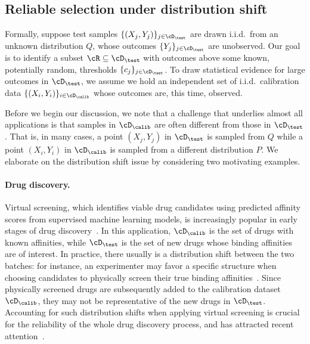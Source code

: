 \subsection{Reliable selection under distribution shift}


Formally, suppose test samples $\{(X_{j},Y_{j})\}_{j\in\cD_\test}$
are drawn i.i.d.~from an unknown distribution $Q$, whose outcomes $\{Y_j\}_{j\in\cD_\test}$
are unobserved. Our goal is to identify a subset $\cR\subseteq \cD_\test$
with outcomes above some known, potentially random,
thresholds $\{c_{ j}\}_{j\in \cD_\test}$. To draw statistical evidence for large outcomes in $\cD_\test$,
we assume we hold an independent set of
i.i.d.~calibration data $\{(X_i,Y_i)\}_{i\in \cD_\calib}$ whose outcomes
are, this time, observed.

Before we begin our discussion, we note that
a challenge that underlies almost all applications is that samples in $\cD_\calib$
are often different from those in $\cD_\test$.
That is, in many cases, a point $(X_{j},Y_{j})$ in $\cD_\test$ is sampled from $Q$ while a point $(X_{i},Y_{i})$ in $\cD_\calib$ is sampled from a different distribution $P$.
We elaborate on the distribution shift issue by considering two motivating examples.

\vspace{-0.3em}


\paragraph{Drug discovery.} %
{Virtual screening, which identifies viable drug candidates
using predicted affinity scores from supervised machine learning models,
is increasingly popular in early stages of drug discovery~\cite{huang2007drug,koutsoukas2017deep,vamathevan2019applications,dara2021machine}.
In this application, $\cD_\calib$ is the set of drugs with known affinities, while $\cD_\test$
is the set of new drugs whose binding affinities are of interest.}
In practice, there usually is a distribution shift between the two batches: for instance, an experimenter may favor a
specific structure
when choosing candidates to physically screen their true binding affinities~\cite{polak2015early}. Since physically screened drugs are subsequently added to the calibration dataset $\cD_\calib$, they may not be representative of the new drugs in $\cD_\test$.
%
Accounting for such distribution shifts when applying virtual screening is crucial for
the reliability of the whole drug discovery process, and
has attracted recent attention~\cite{Krstajic2021}.

